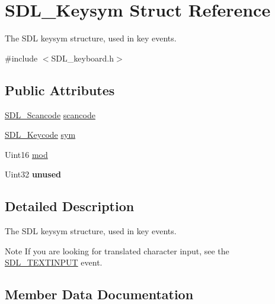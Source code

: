 \hypertarget{struct_s_d_l___keysym}{}\section{S\+D\+L\+\_\+\+Keysym Struct Reference}
\label{struct_s_d_l___keysym}


The S\+DL keysym structure, used in key events.  




{\ttfamily \#include $<$S\+D\+L\+\_\+keyboard.\+h$>$}

\subsection*{Public Attributes}
\begin{DoxyCompactItemize}
\item 
\mbox{\hyperlink{_s_d_l__scancode_8h_a82ab7cff701034fb40a47b5b3a02777b}{S\+D\+L\+\_\+\+Scancode}} \mbox{\hyperlink{struct_s_d_l___keysym_ad47e9120a511e2efc7ec0c6d8a5ec51e}{scancode}}
\item 
\mbox{\hyperlink{_s_d_l__keycode_8h_ae9265f064f13f0f74dfca26a67875171}{S\+D\+L\+\_\+\+Keycode}} \mbox{\hyperlink{struct_s_d_l___keysym_a082ff1fd787b79fa6c3a445deb225f08}{sym}}
\item 
Uint16 \mbox{\hyperlink{struct_s_d_l___keysym_ab519d1b8a9939d3d035f7103f3208291}{mod}}
\item 
\mbox{\label{struct_s_d_l___keysym_ab1d0a50cc619966fb06b92e15cc46dd9}} 
Uint32 {\bfseries unused}
\end{DoxyCompactItemize}


\subsection{Detailed Description}
The S\+DL keysym structure, used in key events. 

\begin{DoxyNote}{Note}
If you are looking for translated character input, see the \mbox{\hyperlink{_s_d_l__events_8h_a3b589e89be6b35c02e0dd34a55f3fccaa4fa2570088f6b9cbd109ae91b511368f}{S\+D\+L\+\_\+\+T\+E\+X\+T\+I\+N\+P\+UT}} event. 
\end{DoxyNote}


\subsection{Member Data Documentation}
\mbox{\label{struct_s_d_l___keysym_ab519d1b8a9939d3d035f7103f3208291}} 
